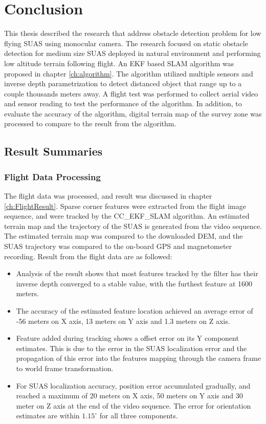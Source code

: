 \chapter{Conclusion}\label{ch:conclusion}

This thesis described the research that address obstacle
detection problem for low flying SUAS using monocular camera. The
research focused on static obstacle detection for medium size SUAS
deployed in natural environment and performing low altitude terrain
following flight.  An EKF based SLAM algorithm was
proposed in chapter \ref{ch:algorithm}. The algorithm utilized
multiple sensors and inverse depth parametrization to detect distanced
object that range up to a couple thousands meters away. A flight test
was performed to collect aerial video and sensor reading to test
the performance of the algorithm. In addition, to evaluate the
accuracy of the algorithm, digital terrain map of the survey zone was
processed to compare to the result from the algorithm. 

\section{Result Summaries}
\subsection{Flight Data Processing}
The flight data was processed, and result was discussed in chapter
\ref{ch:FlightResult}. Sparse corner features were extracted from the
flight image sequence, and were tracked by the CC\_EKF\_SLAM
algorithm. An estimated terrain map and the trajectory of the SUAS is
generated from the video sequence. The estimated terrain map was
compared to the downloaded DEM, and the SUAS trajectory was compared
to the on-board GPS and magnetometer recording. Result from the flight
data are as followed:
\begin{itemize}
  \item Analysis of the result shows that most features tracked by the
  filter has their inverse depth converged to a stable value, with the
  furthest feature at 1600 meters.
  \item The accuracy of the estimated feature location achieved an
  average error of -56 meters on X axis, 13 meters on Y axis and 1.3
  meters on Z axis. 
  \item Feature added during tracking shows a offset error on its Y
  component estimates. This is due to the error in the SUAS
  localization error and the propagation of this error into the
  features mapping through the camera frame to world frame
  transformation.
  \item For SUAS localization accuracy, position error accumulated
  gradually, and reached a maximum of 20 meters on X axis, 50 meters
  on Y axis and 30 meter on Z axis at the end of the video sequence.
  The error for orientation estimates are within $1.15^\circ$ for all
  three components.
\end{itemize}

